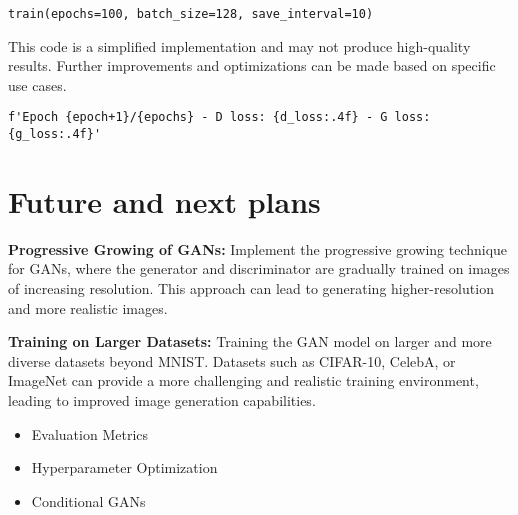 \documentclass[11pt,a4paper]{article}
\begin{document}
\begin{verbatim}
train(epochs=100, batch_size=128, save_interval=10)
\end{verbatim}

This code is a simplified implementation and may not produce high-quality results. Further improvements and optimizations can be made based on specific use cases.

\begin{verbatim}
f'Epoch {epoch+1}/{epochs} - D loss: {d_loss:.4f} - G loss: {g_loss:.4f}'
\end{verbatim}

\section{Future and next plans}

\textbf{Progressive Growing of GANs:} Implement the progressive growing technique for GANs, where the generator and discriminator are gradually trained on images of increasing resolution. This approach can lead to generating higher-resolution and more realistic images.

\textbf{Training on Larger Datasets:} Training the GAN model on larger and more diverse datasets beyond MNIST. Datasets such as CIFAR-10, CelebA, or ImageNet can provide a more challenging and realistic training environment, leading to improved image generation capabilities.

\begin{itemize}
\item Evaluation Metrics
\item Hyperparameter Optimization
\item Conditional GANs
\end{itemize} 
\end{document}
